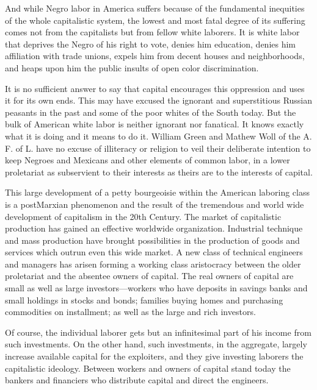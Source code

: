 \documentclass[letterpaper,10pt,english]{jupyterBook}
\begin{document}
\sphinxAtStartPar
And while Negro labor in America suffers because of the fundamental inequities of the whole capitalistic system, the lowest and most fatal degree of its suffering comes not from the capitalists but from fellow white laborers. It is white labor that deprives the Negro of his right to vote, denies him education, denies him affiliation with trade unions, expels him from decent houses and neighborhoods, and heaps upon him the public insults of open color discrimination.

\sphinxAtStartPar
It is no sufficient answer to say that capital encourages this oppression and uses it for its own ends. This may have excused the ignorant and superstitious Russian peasants in the past and some of the poor whites of the South today. But the bulk of American white labor is neither ignorant nor fanatical. It knows exactly what it is doing and it means to do it. William Green and Mathew Woll of the A. F. of L. have no excuse of illiteracy or religion to veil their deliberate intention to keep Negroes and Mexicans and other elements of common labor, in a lower proletariat as subservient to their interests as theirs are to the interests of capital.

\sphinxAtStartPar
This large development of a petty bourgeoisie within the American laboring class is a post\sphinxhyphen{}Marxian phenomenon and the result of the tremendous and world wide development of capitalism in the 20th Century. The market of capitalistic production has gained an effective world\sphinxhyphen{}wide organization. Industrial technique and mass production have brought possibilities in the production of goods and services which out\sphinxhyphen{}run even this wide market. A new class of technical engineers and managers has arisen forming a working class aristocracy between the older proletariat and the absentee owners of capital. The real owners of capital are small as well as large investors—workers who have deposits in savings banks and small holdings in stocks and bonds; families buying homes and purchasing commodities on installment; as well as the large and rich investors.

\sphinxAtStartPar
Of course, the individual laborer gets but an infinitesimal part of his income from such investments. On the other hand, such investments, in the aggregate, largely increase available capital for the exploiters, and they give investing laborers the capitalistic ideology. Between workers and owners of capital stand today the bankers and financiers who distribute capital and direct the engineers.
\end{document}
